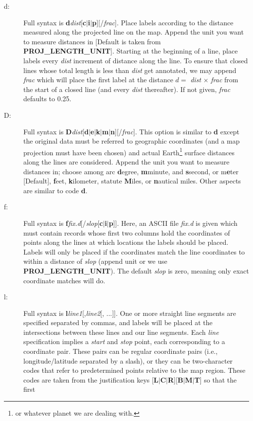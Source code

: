 \begin{description}
\item [d:] Full syntax is {\bf d}{\it dist}[{\bf c$|$i$|$p}][/{\it frac}].
Place labels according to the distance measured along the projected line on the map.  Append the
unit you want to measure distances in [Default is taken from \textbf{PROJ\_LENGTH\_UNIT}].
Starting at the beginning of a line, place labels every {\it dist} increment of
distance along the line.  To ensure that closed lines whose total length is less
than {\it dist} get annotated, we may append {\it frac} which will place the first
label at the distance $d =$ {\it dist} $\times$ {\it frac} from the start of a closed
line (and every {\it dist} thereafter).  If not given, {\it frac} defaults to 0.25.
\item [D:] Full syntax is {\bf D}{\it dist}[{\bf d$|$e$|$k$|$m$|$n}][/{\it frac}].
This option is similar to {\bf d} except the original data must be referred to geographic
coordinates (and a map projection must have been chosen) and actual Earth\footnote{or whatever
planet we are dealing with.} surface distances along the lines are considered.  Append the
unit you want to measure distances in; choose among arc {\bf d}egree, {\bf m}minute, and {\bf s}second,
or m{\bf e}ter [Default], {\bf f}eet, {\bf k}ilometer, statute {\bf M}iles, or {\bf n}autical miles.  Other aspects are similar to code {\bf d}.
\item [f:] Full syntax is {\bf f}{\it fix.d}[/{\it slop}[{\bf c$|$i$|$p}]].  Here, an ASCII file {\it fix.d} is
given which must contain records whose first two columns hold the coordinates of points along
the lines at which locations the labels should be placed.  Labels will only be placed if the coordinates
match the line coordinates to within a distance of {\it slop} (append unit or we use \textbf{PROJ\_LENGTH\_UNIT}).
The default {\it slop} is zero, meaning only exact coordinate matches will do.
\item [l:] Full syntax is {\bf l}{\it line1}[,{\it line2}[, ...]].  One or more straight line segments
are specified separated by commas, and labels will be placed at the intersections between these lines and
our line segments.  Each {\it line} specification implies a {\it start} and {\it stop} point, each
corresponding to a coordinate pair.  These pairs can be regular coordinate pairs (i.e., longitude/latitude separated by a slash), or they
can be two-character codes that refer to predetermined points relative to the map region.  These codes
are taken from the  justification keys [{\bf L$|$C$|$R}][{\bf B$|$M$|$T}] so that the first

\end{description}
